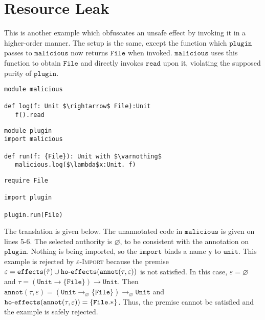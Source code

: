 \documentclass[sigplan,10pt,review]{acmart}\settopmatter{printfolios=true,printccs=false,printacmref=false}
\newcommand{\hyphen}{\hbox{-}}
\newcommand{\unit}{\kwa{unit}}
\newcommand{\kwa}[1]{\mathtt{#1}}
\newcommand{\annot}[2]{\kwa{annot}(#1, #2)}
\newcommand{\fx}[1]{\kwa{effects}(#1)}
\newcommand{\hofx}[1]{\kwa{ho \hyphen effects}(#1)}
\begin{document}
%
%
%
%
%

\section{Resource Leak}

This is another example which obfuscates an unsafe effect by invoking it in a higher-order manner. The setup is the same, except the function which $\kwa{plugin}$ passes to $\kwa{malicious}$ now returns $\kwa{File}$ when invoked. $\kwa{malicious}$ uses this function to obtain $\kwa{File}$ and directly invokes $\kwa{read}$ upon it, violating the supposed purity of $\kwa{plugin}$.

\begin{lstlisting}
module malicious

def log(f: Unit $\rightarrow$ File):Unit
   f().read
\end{lstlisting}

\begin{lstlisting}
module plugin
import malicious

def run(f: {File}): Unit with $\varnothing$
   malicious.log($\lambda$x:Unit. f)
\end{lstlisting}

\begin{lstlisting}
require File

import plugin

plugin.run(File)
\end{lstlisting}

The translation is given below. The unannotated code in $\kwa{malicious}$ is given on lines 5-6. The selected authority is $\varnothing$, to be consistent with the annotation on $\kwa{plugin}$. Nothing is being imported, so the $\kwa{import}$ binds a name $\kwa{y}$ to $\unit$. This example is rejected by \textsc{$\varepsilon$-Import} because the premise $\varepsilon = \fx{\hat \tau} \cup \hofx{\annot{\tau}{\varepsilon}}$ is not satisfied. In this case, $\varepsilon = \varnothing$ and $\tau = \kwa{ (Unit \rightarrow \{ File \}) \rightarrow Unit }$. Then $\annot{\tau}{\varepsilon} = \kwa{ (Unit \rightarrow_{\varnothing} \{ File \}) \rightarrow_{\varnothing} Unit }$ and $\hofx{\annot{\tau}{\varepsilon}} = \{ \kwa{File.*} \}$. Thus, the premise cannot be satisfied and the example is safely rejected.
\end{document}
